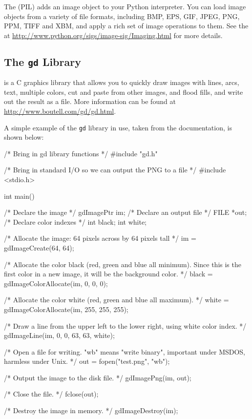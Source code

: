 \documentclass[twoside,11pt]{starlink}
\begin{document}
The  (PIL) adds
an image object to your Python interpreter. You can load image objects
from a variety of file formats, including BMP, EPS, GIF, JPEG, PNG,
PPM, TIFF and XBM, and apply a rich set of image operations to them.
See the  at \url{http://www.python.org/sigs/image-sig/Imaging.html} for more
details.

\subsection{The \texttt{gd} Library\label{sc15_gd}}

 is a C
graphics library that allows you to quickly draw images with lines,
arcs, text, multiple colors, cut and paste from other images, and
flood fills, and write out the result as a 
file. More information can be found at \url{http://www.boutell.com/gd/gd.html}.

A simple example of the \texttt{gd} library in use, taken from the
documentation, is shown below:

\begin{small}
\begin{terminalv}
/* Bring in gd library functions */
#include "gd.h"

/* Bring in standard I/O so we can output the PNG to a file */
#include <stdio.h>

int main() {
        /* Declare the image */
        gdImagePtr im;
        /* Declare an output file */
        FILE *out;
        /* Declare color indexes */
        int black;
        int white;

        /* Allocate the image: 64 pixels across by 64 pixels tall */
        im = gdImageCreate(64, 64);

        /* Allocate the color black (red, green and blue all minimum).
                Since this is the first color in a new image, it will
                be the background color. */
        black = gdImageColorAllocate(im, 0, 0, 0);

        /* Allocate the color white (red, green and blue all maximum). */
        white = gdImageColorAllocate(im, 255, 255, 255);

        /* Draw a line from the upper left to the lower right,
                using white color index. */
        gdImageLine(im, 0, 0, 63, 63, white);

        /* Open a file for writing. "wb" means "write binary", important
                under MSDOS, harmless under Unix. */
        out = fopen("test.png", "wb");

        /* Output the image to the disk file. */
        gdImagePng(im, out);

        /* Close the file. */
        fclose(out);

        /* Destroy the image in memory. */
        gdImageDestroy(im);
}
\end{terminalv}
\end{small}
\end{document}
